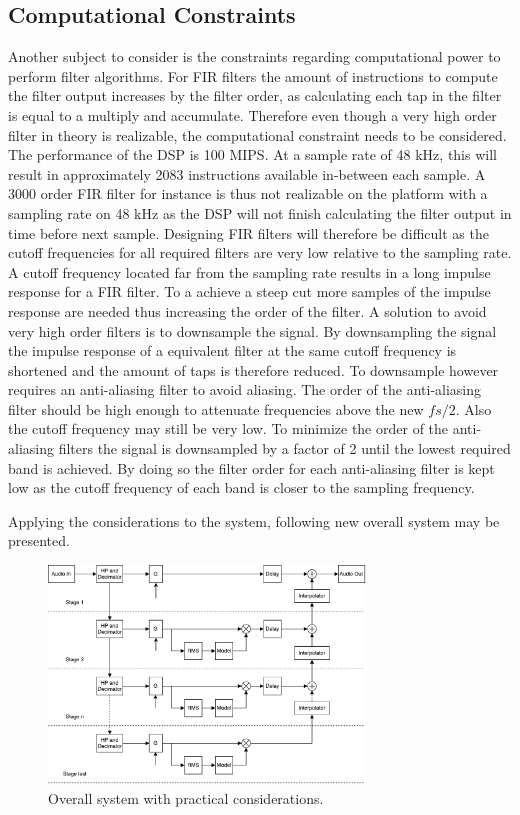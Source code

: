 \subsection*{Computational Constraints}
Another subject to consider is the constraints regarding computational power to perform filter algorithms. For FIR filters the amount of instructions to compute the filter output increases by the filter order, as calculating each tap in the filter is equal to a multiply and accumulate. Therefore even though a very high order filter in theory is realizable, the computational constraint needs to be considered. The performance of the DSP is 100 MIPS. At a sample rate of 48 kHz, this will result in approximately 2083 instructions available in-between each sample. A 3000 order FIR filter for instance is thus not realizable on the platform with a sampling rate on 48 kHz as the DSP will not finish calculating the filter output in time before next sample. Designing FIR filters will therefore be difficult as the cutoff frequencies for all required filters are very low relative to the sampling rate. A cutoff frequency located far from the sampling rate results in a long impulse response for a FIR filter. To a achieve a steep cut more samples of the impulse response are needed thus increasing the order of the filter. A solution to avoid very high order filters is to downsample the signal. By downsampling the signal the impulse response of a equivalent filter at the same cutoff frequency is shortened and the amount of taps is therefore reduced. To downsample however requires an anti-aliasing filter to avoid aliasing. The order of the anti-aliasing filter should be high enough to attenuate frequencies above the new $fs/2$. Also the cutoff frequency may still be very low. To minimize the order of the anti-aliasing filters the signal is  downsampled by a factor of 2 until the lowest required band is achieved. By doing so the filter order for each anti-aliasing filter is kept low as the cutoff frequency of each band is closer to the sampling frequency.

Applying the considerations to the system, following new overall system may be presented.

\begin{figure}[H]
\centering
\includegraphics[width=0.75\textwidth]{figures/designRealBlock1.pdf}
\caption{Overall system with practical considerations.}
\label{fig:designRealBlock}
\end{figure}

